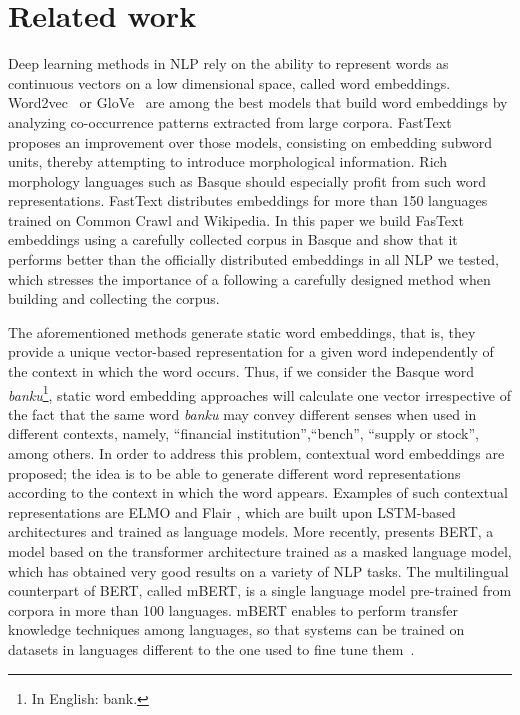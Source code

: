 \documentclass[10pt, a4paper]{article}
\begin{document}

\section{Related work}\label{sec:related-work}


Deep learning methods in NLP rely on the ability to represent words as continuous vectors on a low dimensional space, called word embeddings. Word2vec~\cite{mikolov2013distributed} or GloVe~\cite{Pennington14glove:global} are among the best models that build word embeddings by analyzing co-occurrence patterns extracted from large corpora. FastText~\cite{fasttext1_bojanowski2017enriching} proposes an improvement over those models, consisting on embedding subword units, thereby attempting to introduce morphological information. Rich morphology languages such as Basque should especially profit from such word representations. FastText distributes embeddings for more than 150 languages trained on Common Crawl and  Wikipedia. In this paper we build FasText embeddings using a carefully collected corpus in Basque and show that it performs better than the officially distributed embeddings in all NLP we tested, which stresses the importance of a following a carefully designed method when building and collecting the corpus.

The aforementioned methods generate static word embeddings, that is, they provide a unique vector-based representation for a given word independently of the context in which the word occurs. Thus, if we consider the Basque word \emph{banku}\footnote{In English: bank.}, static word embedding approaches will calculate one vector irrespective of the fact that the same word \emph{banku} may convey different senses when used in different contexts, namely, ``financial institution'',``bench'', ``supply or stock'', among others. In order to address this problem, contextual word embeddings are proposed; the idea is to be able to generate different word representations according to the context in which the word appears. Examples of such contextual representations are ELMO \cite{Peters:2018} and Flair \cite{akbik2018coling}, which are built upon LSTM-based architectures and trained as language models. More recently,  presents BERT, a model based on the transformer architecture trained as a masked language model, which has obtained very good results on a variety of NLP tasks. The multilingual counterpart of BERT, called mBERT, is a single language model pre-trained from corpora in more than 100 languages. mBERT enables to perform transfer knowledge techniques among languages, so that systems can be trained on datasets in languages different to the one used to fine tune them~\cite{heinzerling-strube-2019-sequence,DBLP:conf/acl/PiresSG19}.
\end{document}

